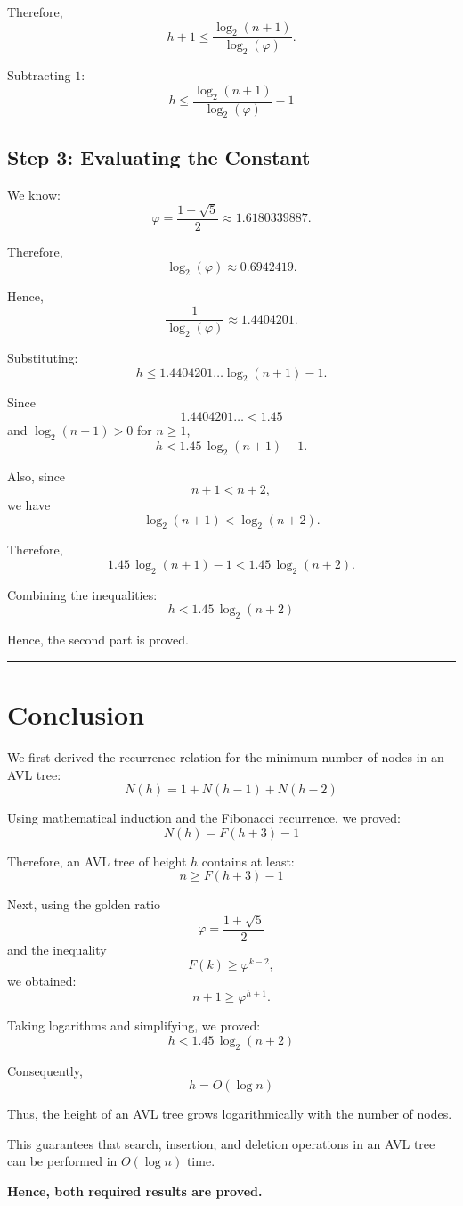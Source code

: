 \documentclass[11pt,a4paper]{article}
\begin{document}
Therefore,
\[
  h+1 \le \frac{\log_2(n+1)}{\log_2(\varphi)}.
\]

Subtracting $1$:
\[
  \boxed{h \le \frac{\log_2(n+1)}{\log_2(\varphi)} - 1}
\]

\subsection*{Step 3: Evaluating the Constant}

We know:
\[
  \varphi = \frac{1+\sqrt{5}}{2} \approx 1.6180339887.
\]

Therefore,
\[
  \log_2(\varphi) \approx 0.6942419.
\]

Hence,
\[
  \frac{1}{\log_2(\varphi)} \approx 1.4404201.
\]

Substituting:
\[
  h \le 1.4404201\ldots \log_2(n+1) - 1.
\]

Since
\[
  1.4404201\ldots < 1.45
\]
and $\log_2(n+1) > 0$ for $n \ge 1$,
\[
  h < 1.45\,\log_2(n+1) - 1.
\]

Also, since
\[
  n + 1 < n + 2,
\]
we have
\[
  \log_2(n+1) < \log_2(n+2).
\]

Therefore,
\[
  1.45\,\log_2(n+1) - 1 < 1.45\,\log_2(n+2).
\]

Combining the inequalities:
\[
  \boxed{h < 1.45\,\log_2(n+2)}
\]

Hence, the second part is proved.

\medskip
\hrule
\medskip

\section{Conclusion}

We first derived the recurrence relation for the minimum number of nodes in an AVL tree:
\[
  \boxed{N(h) = 1 + N(h-1) + N(h-2)}
\]

Using mathematical induction and the Fibonacci recurrence, we proved:
\[
  \boxed{N(h) = F(h+3) - 1}
\]

Therefore, an AVL tree of height $h$ contains at least:
\[
  \boxed{n \ge F(h+3) - 1}
\]

Next, using the golden ratio
\[
  \varphi = \frac{1+\sqrt{5}}{2}
\]
and the inequality
\[
  F(k) \ge \varphi^{k-2},
\]
we obtained:
\[
  n + 1 \ge \varphi^{h+1}.
\]

Taking logarithms and simplifying, we proved:
\[
  \boxed{h < 1.45\,\log_2(n+2)}
\]

Consequently,
\[
  \boxed{h = O(\log n)}
\]

Thus, the height of an AVL tree grows logarithmically with the number of nodes.

This guarantees that search, insertion, and deletion operations in an AVL tree can be performed in $O(\log n)$ time.

\textbf{Hence, both required results are proved.}
\end{document}
